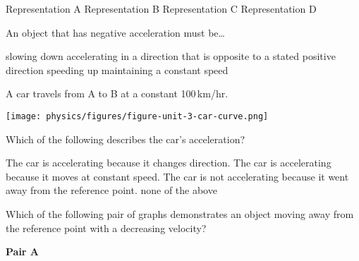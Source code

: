 \documentclass[answers]{exam}
\begin{document}
\begin{questions}
{\color{white}
\begin{randomizeoneparchoices}[norandomize,]
    \choice Representation A
    \choice Representation B
    \choice Representation C
    \correctchoice Representation D
\end{randomizeoneparchoices}
}

\question 
An object that has negative acceleration must be\dots

\begin{randomizechoices}
    \choice slowing down
    \correctchoice accelerating in a direction that is opposite to a stated positive direction
    \choice speeding up 
    \choice maintaining a constant speed
\end{randomizechoices}


\question
A car travels from A to B at a constant 100\,km/hr.

\begin{center}
    \texttt{[image: physics/figures/figure-unit-3-car-curve.png]}
\end{center}

Which of the following describes the car’s acceleration?
\clearpage

\begin{randomizechoices}[keeplast]
    \correctchoice The car is accelerating because it changes direction.
    \choice The car is accelerating because it moves at constant speed.
    \choice The car is not accelerating because it went away from the reference point.
    \choice none of the above
\end{randomizechoices}

\question 
Which of the following pair of graphs demonstrates an object moving away from the reference point with a decreasing velocity?

\bigskip

\begin{minipage}{0.45\textwidth}
\centering
\textbf{Pair A}

\vspace{1ex}


\end{minipage}
\end{questions}
\end{document}
